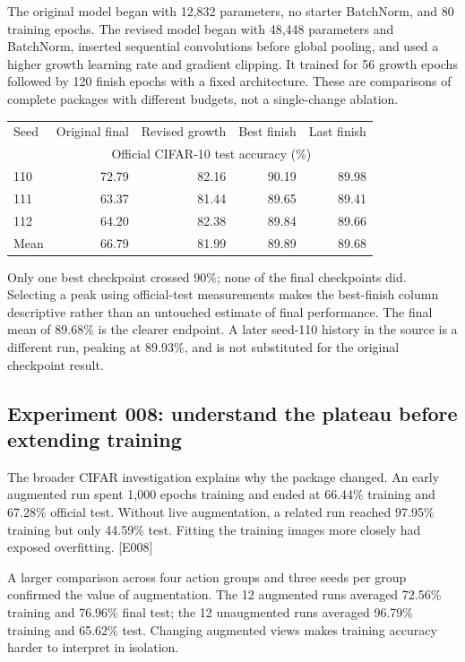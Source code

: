 \documentclass[11pt,a4paper]{article}
\newcommand{\ev}[1]{\textcolor{ink}{\small[#1]}}
\begin{document}
The original model began with 12,832 parameters, no starter BatchNorm, and 80 training epochs. The revised model began with 48,448 parameters and BatchNorm, inserted sequential convolutions before global pooling, and used a higher growth learning rate and gradient clipping. It trained for 56 growth epochs followed by 120 finish epochs with a fixed architecture. These are comparisons of complete packages with different budgets, not a single-change ablation.

\begin{center}
\begin{tabular}{lrrrr}\toprule
Seed & Original final & Revised growth & Best finish & Last finish\\
 &\multicolumn{4}{c}{Official CIFAR-10 test accuracy (\%)}\\\midrule
110 &72.79&82.16&90.19&89.98\\
111 &63.37&81.44&89.65&89.41\\
112 &64.20&82.38&89.84&89.66\\\midrule
Mean &66.79&81.99&89.89&89.68\\\bottomrule
\end{tabular}
\end{center}

Only one best checkpoint crossed 90\%; none of the final checkpoints did. Selecting a peak using official-test measurements makes the best-finish column descriptive rather than an untouched estimate of final performance. The final mean of 89.68\% is the clearer endpoint. A later seed-110 history in the source is a different run, peaking at 89.93\%, and is not substituted for the original checkpoint result.

\subsection{Experiment 008: understand the plateau before extending training}
The broader CIFAR investigation explains why the package changed. An early augmented run spent 1,000 epochs training and ended at 66.44\% training and 67.28\% official test. Without live augmentation, a related run reached 97.95\% training but only 44.59\% test. Fitting the training images more closely had exposed overfitting. \ev{E008}

A larger comparison across four action groups and three seeds per group confirmed the value of augmentation. The 12 augmented runs averaged 72.56\% training and 76.96\% final test; the 12 unaugmented runs averaged 96.79\% training and 65.62\% test. Changing augmented views makes training accuracy harder to interpret in isolation.
\end{document}
